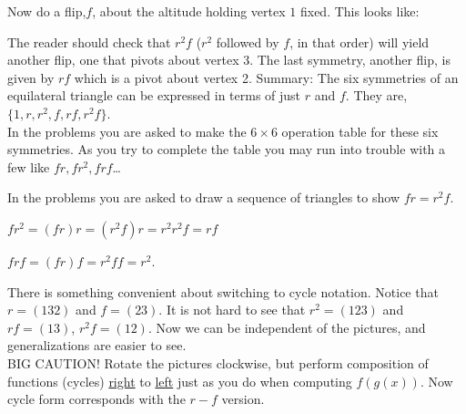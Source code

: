 \documentclass[12pt]{book}
\theoremstyle{definition}
\begin{document}
Now do a flip,$ f $, about the altitude holding vertex $ 1 $ fixed. This looks like:


The reader should check that $ r^2f $ ($ r^2 $ followed by $ f $, in that order) will yield another flip, one that pivots about vertex 3. The last symmetry, another flip, is given by $ rf $ which is a pivot about vertex 2.\clearpage
Summary: The six symmetries of an equilateral triangle can be expressed in terms of just $ r $ and $ f $. They are, $ \{1,r,r^2,f,rf,r^2f\} $.\\
In the problems you are asked to make the $ 6\times 6 $ operation table for these six symmetries. As you try to complete the table you may run into trouble with a few like $ fr, fr^2, frf $\dots\\

\begin{tcexample}{}{}
In the problems you are asked to draw a sequence of triangles to show $ fr=r^2f. $
\end{tcexample}

\begin{tcexample}{}{}
	$ fr^2=(fr)r=(r^2f)r=r^2r^2f=rf $
\end{tcexample}

\begin{tcexample}{}{}
$ frf=(fr)f=r^2ff=r^2 $.
\end{tcexample}

There is something convenient about switching to cycle notation. Notice that $ r=(132) $ and $ f=(23) $. It is not hard to see that $ r^2=(123) $ and $ rf=(13) $, $ r^2f=(12) $. Now we can be independent of the pictures, and generalizations are easier to see.\\
BIG CAUTION! Rotate the pictures clockwise, but perform composition of functions (cycles) \underline{right} to \underline{left} just as you do when computing $ f(g(x)) $. Now cycle form corresponds with the $ r-f $ version. 
\clearpage
\end{document}
